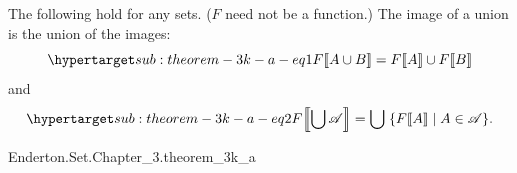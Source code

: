 \documentclass{report}
\begin{document}
\subsection{}%

  \begin{theorem}[3K(a)]
    The following hold for any sets. ($F$ need not be a function.)
    The image of a union is the union of the images:
      \begin{equation}
        \hyperlabel{sub:theorem-3k-a-eq1}
        \img{F}{A \cup B} = \img{F}{A} \cup \img{F}{B}
      \end{equation}
      and
      \begin{equation}
        \hyperlabel{sub:theorem-3k-a-eq2}
        \img{F}{\bigcup{\mathscr{A}}} =
          \bigcup\;\{\img{F}{A} \mid A \in \mathscr{A}\}.
      \end{equation}
  \end{theorem}

    {Enderton.Set.Chapter\_3.theorem\_3k\_a}
\end{document}
